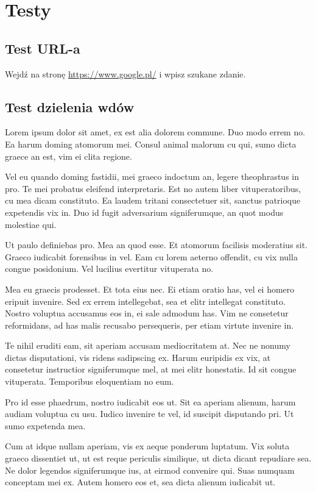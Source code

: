 \chapter{Testy}

\section{Test URL-a}

Wejdź na stronę \url{https://www.google.pl/} i wpisz szukane zdanie.

\clearpage

\section{Test dzielenia wdów}

Lorem ipsum dolor sit amet, ex est alia dolorem commune. Duo modo errem no. Ea harum doming atomorum mei. Consul animal malorum cu qui, sumo dicta graece an est, vim ei clita regione.

Vel eu quando doming fastidii, mei graeco indoctum an, legere theophrastus in pro. Te mei probatus eleifend interpretaris. Est no autem liber vituperatoribus, cu mea dicam constituto. Ea laudem tritani consectetuer sit, sanctus patrioque expetendis vix in. Duo id fugit adversarium signiferumque, an quot modus molestiae qui.

Ut paulo definiebas pro. Mea an quod esse. Et atomorum facilisis moderatius sit. Graeco iudicabit forensibus in vel. Eam cu lorem aeterno offendit, cu vix nulla congue posidonium. Vel lucilius evertitur vituperata no.

Mea eu graecis prodesset. Et tota eius nec. Ei etiam oratio has, vel ei homero eripuit invenire. Sed ex errem intellegebat, sea et elitr intellegat constituto. Nostro voluptua accusamus eos in, ei sale admodum has. Vim ne consetetur reformidans, ad has malis recusabo persequeris, per etiam virtute invenire in.

Te nihil eruditi eam, sit aperiam accusam mediocritatem at. Nec ne nonumy dictas disputationi, vis ridens sadipscing ex. Harum euripidis ex vix, at consetetur instructior signiferumque mel, at mei elitr honestatis. Id sit congue vituperata. Temporibus eloquentiam no eum.

Pro id esse phaedrum, nostro iudicabit eos ut. Sit ea aperiam alienum, harum audiam voluptua cu usu. Iudico invenire te vel, id suscipit disputando pri. Ut sumo expetenda mea.

Cum at idque nullam aperiam, vis ex aeque ponderum luptatum. Vix soluta graeco dissentiet ut, ut est reque periculis similique, ut dicta dicant repudiare sea. Ne dolor legendos signiferumque ius, at eirmod convenire qui. Suas numquam conceptam mei ex. Autem homero eos et, sea dicta alienum iudicabit ut.

